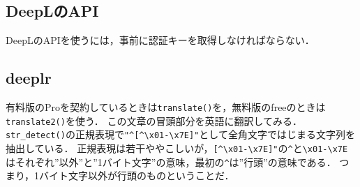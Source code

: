 \documentclass[
]{article}
\begin{document}
\hypertarget{deeplux306eapi}{%
\subsection{DeepLのAPI}\label{deeplux306eapi}}

DeepLのAPIを使うには，事前に認証キーを取得しなければならない．

\hypertarget{deeplr-1}{%
\subsection{deeplr}\label{deeplr-1}}

有料版のProを契約しているときは\texttt{translate()}を，無料版のfreeのときは\texttt{translate2()}を使う．
この文章の冒頭部分を英語に翻訳してみる．
\texttt{str\_detect()}の正規表現で\texttt{"\^{}{[}\^{}\textbackslash{}x01-\textbackslash{}x7E{]}"}として全角文字ではじまる文字列を抽出している．
正規表現は若干ややこしいが，\texttt{{[}\^{}\textbackslash{}x01-\textbackslash{}x7E{]}"}の\texttt{\^{}}と\texttt{\textbackslash{}x01-\textbackslash{}x7E}はそれぞれ''以外''と''1バイト文字''の意味，最初の\texttt{\^{}}は''行頭''の意味である．
つまり，1バイト文字以外が行頭のものということだ．
\end{document}
